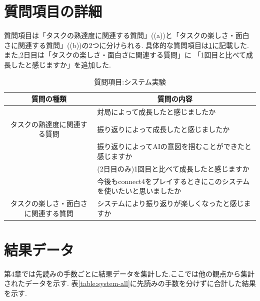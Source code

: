 \section{質問項目の詳細}
質問項目は「タスクの熟達度に関連する質問」((a))と「タスクの楽しさ・面白さに関連する質問」((b))の2つに分けられる.
具体的な質問項目は\ref{table:query}に記載した.また,2日目は「タスクの楽しさ・面白さに関連する質問」に
「1回目と比べて成長したと感じますか」を追加した.
\begin{table}[H]
    \caption{質問項目:システム実験}
    \label{table:query}
    \centering
	\small
    \begin{tabular}{c||l}
        \multicolumn{1}{c|}{質問の種類} & \multicolumn{1}{c}{質問の内容} \\ \hline \hline
        \multicolumn{1}{c||}{}&対局によって成長したと感じましたか \\
        タスクの熟達度に関連する質問 & 振り返りによって成長したと感じましたか \\
		\multicolumn{1}{c||}{}&振り返りによってAIの意図を掴むことができたと感じますか \\
		\multicolumn{1}{c||}{} & (2日目のみ)1回目と比べて成長したと感じますか\\\hline
        \multicolumn{1}{c||}{} & 今後もconnect4をプレイするときにこのシステムを使いたいと思いましたか \\
        タスクの楽しさ・面白さに関連する質問 & システムにより振り返りが楽しくなったと感じますか\\
    \end{tabular}
    
\end{table}
\section{結果データ}
第4章では先読みの手数ごとに結果データを集計した.ここでは他の観点から集計されたデータを示す.
表\ref{table:system-all}に先読みの手数を分けずに合計した結果を示す.
\begin{table}[H]
    \caption{結果:総合}
    \label{table:system-all}
    \scriptsize
    \centering
    
\end{table}

